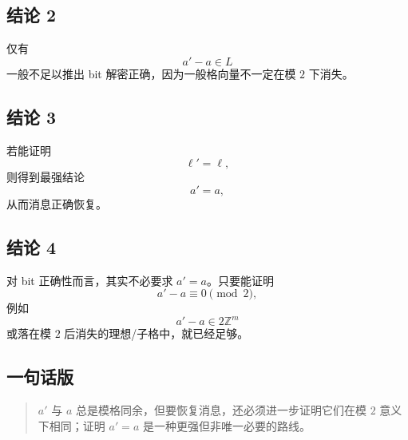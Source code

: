 \documentclass[12pt,a4paper]{article}
\begin{document}
\subsection*{结论 2}
仅有
\[
a'-a\in L
\]
一般不足以推出 bit 解密正确，因为一般格向量不一定在模 \(2\) 下消失。

\subsection*{结论 3}
若能证明
\[
\ell'=\ell,
\]
则得到最强结论
\[
a'=a,
\]
从而消息正确恢复。

\subsection*{结论 4}
对 bit 正确性而言，其实不必要求 \(a'=a\)。只要能证明
\[
a'-a \equiv 0 \pmod 2,
\]
例如
\[
a'-a\in 2\mathbb Z^m
\]
或落在模 \(2\) 后消失的理想/子格中，就已经足够。

\subsection*{一句话版}
\begin{quote}
\(a'\) 与 \(a\) 总是模格同余，但要恢复消息，还必须进一步证明它们在模 \(2\) 意义下相同；证明 \(a'=a\) 是一种更强但非唯一必要的路线。
\end{quote}
\end{document}
